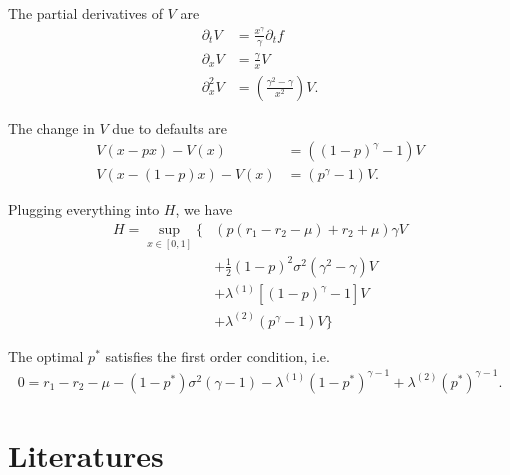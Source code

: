 \documentclass[square]{article} %
\theoremstyle{plain}
\theoremstyle{definition} %
\begin{document}
The partial derivatives of $V$ are
\begin{align*}
\partial_t V &= \frac{x^\gamma}{\gamma}\partial_t f\\
\partial_x V &= \frac{\gamma}{x}V\\
\partial^2_xV &= \left(\frac{\gamma^2 - \gamma}{x^2}\right)V.
\end{align*}

The change in $V$ due to defaults are
\begin{align*}
V(x-px) - V(x)&=\left((1-p)^\gamma - 1\right) V\\
V(x-(1-p)x) - V(x) &= (p^\gamma-1) V.
\end{align*}

Plugging everything into $H$, we have
\begin{align*}
H = \sup_{x\in[0,1]}
\Big\{
&\left(p(r_1 - r_2 - \mu) + r_2 + \mu\right)\gamma V\\
&+\frac{1}{2}(1-p)^2\sigma^2 (\gamma^2-\gamma)V \\ 
&+ \lambda^{(1)}\left[(1-p)^\gamma - 1 \right]V\\
&+ \lambda^{(2)}(p^\gamma -1)V
\Big\}
\end{align*}

The optimal $p^*$ satisfies the first order condition, i.e.
\begin{align*}
0=r_1-r_2 - \mu - (1-p^*)\sigma^2 (\gamma - 1) - \lambda^{(1)}(1-p^*)^{\gamma-1} + \lambda^{(2)}(p^*)^{\gamma-1}.
\end{align*}





\section{Literatures}
\end{document}
